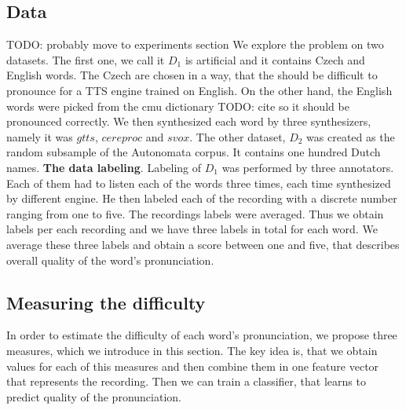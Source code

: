 \subsection{Data}
TODO: probably move to experiments section
We explore the problem on two datasets. The first one, we call it $D_1$ is artificial and it contains Czech and English words. The Czech are chosen in a way, that the should be difficult to pronounce for a TTS engine trained on English. On the other hand, the English words were picked from the cmu dictionary TODO: cite so it should be pronounced correctly. We then synthesized each word by three synthesizers, namely it was $gtts$, $cereproc$ and $svox$. The other dataset, $D_2$ was created as the random subsample of the Autonomata corpus. It contains one hundred Dutch names.
\linebreak \linebreak
\textbf{The data labeling}. Labeling of $D_1$  was performed by three annotators. Each of them had to listen each of the words three times, each time synthesized by different engine. He then labeled each of the recording with a discrete number ranging from one to five. The recordings labels were averaged. Thus we obtain labels per each recording and we have three labels in total for each word. We average these three labels and obtain a score between one and five, that describes overall quality of the word's pronunciation.
\subsection{Measuring the difficulty}
In order to estimate the difficulty of each word's pronunciation, we propose three measures, which we introduce in this section. The key idea is, that we obtain values for each of this measures and then combine them in one feature vector that represents the recording. Then we can train a classifier, that learns to predict quality of the pronunciation.

